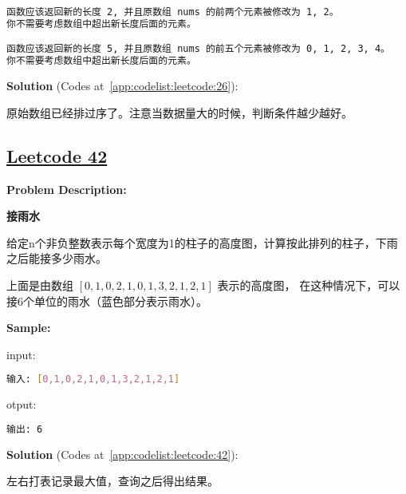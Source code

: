 \begin{lstlisting}[language=bash]
函数应该返回新的长度 2, 并且原数组 nums 的前两个元素被修改为 1, 2。 
你不需要考虑数组中超出新长度后面的元素。

函数应该返回新的长度 5, 并且原数组 nums 的前五个元素被修改为 0, 1, 2, 3, 4。
你不需要考虑数组中超出新长度后面的元素。
\end{lstlisting}

\textbf{Solution }(Codes at~\ref{app:codelist:leetcode:26}):\par

原始数组已经排过序了。注意当数据量大的时候，判断条件越少越好。\par



\subsection{\href{https://leetcode-cn.com/}{Leetcode 42}}\label{app:problemlist:leetcode:42}

\textbf{Problem Description:}\par

\textbf{接雨水}\par

给定n个非负整数表示每个宽度为1的柱子的高度图，计算按此排列的柱子，下雨之后能接多少雨水。\par

上面是由数组 $ [0,1,0,2,1,0,1,3,2,1,2,1] $ 表示的高度图，
在这种情况下，可以接6个单位的雨水（蓝色部分表示雨水）。\par


\textbf{Sample:}\par

input:\par

\begin{lstlisting}[language=bash]
输入: [0,1,0,2,1,0,1,3,2,1,2,1]
\end{lstlisting}

otput:\par

\begin{lstlisting}[language=bash]
输出: 6
\end{lstlisting}

\textbf{Solution }(Codes at~\ref{app:codelist:leetcode:42}):\par

左右打表记录最大值，查询之后得出结果。\par

